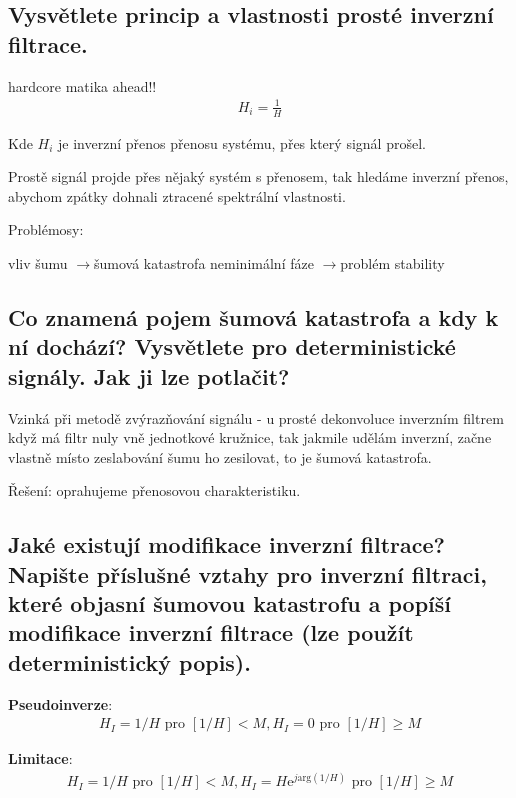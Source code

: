 \documentclass[a4paper,12pt]{article}   %
\newcommand{\rrarr}{$\rightarrow$}
\newcommand{\mt}[1]{$#1$}
\newcommand{\e}{\text{e}}
\begin{document}
\subsection{Vysvětlete princip a vlastnosti prosté inverzní filtrace.}

hardcore matika ahead!!
\begin{align*}
        H_i = \frac{1}{H}
\end{align*}

Kde \mt{H_i} je inverzní přenos přenosu systému, přes který signál prošel.

Prostě signál projde přes nějaký systém s přenosem, tak hledáme inverzní přenos, abychom zpátky dohnali ztracené spektrální vlastnosti. 

Problémosy:
\begin{outline}
        \1 vliv šumu \rrarr šumová katastrofa
        \1 neminimální fáze \rrarr problém stability
\end{outline}



\subsection{Co znamená pojem šumová katastrofa a kdy k ní dochází? Vysvětlete pro deterministické signály. Jak ji lze potlačit?}

Vzinká při metodě zvýrazňování signálu - u prosté dekonvoluce inverzním filtrem
když má filtr nuly vně jednotkové kružnice, tak jakmile udělám inverzní, začne vlastně místo zeslabování šumu ho zesilovat, to je šumová katastrofa.

Řešení: oprahujeme přenosovou charakteristiku.


\subsection{Jaké existují modifikace inverzní filtrace? Napište příslušné vztahy pro inverzní filtraci, které objasní šumovou katastrofu a popíší modifikace inverzní filtrace (lze použít deterministický popis).}
\textbf{Pseudoinverze}:
\begin{align*}
        H_I = 1/H \text{ pro } [1/H] < M, H_I = 0 \text{ pro } [1/H] \geq M 
\end{align*}

\textbf{Limitace}:
\begin{align*}
        H_I = 1/H \text{ pro } [1/H] < M, H_I = H\e^{j\text{arg}(1/H)} \text{ pro } [1/H] \geq M
\end{align*}
\end{document}
